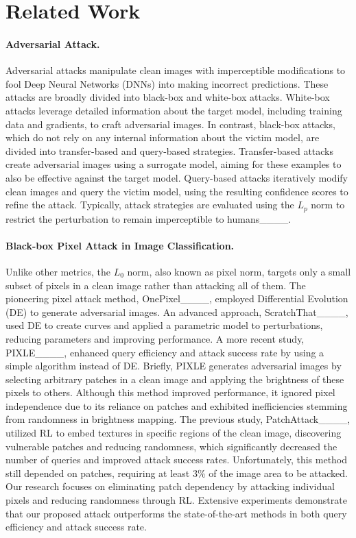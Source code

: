 \section{Related Work}
\paragraph{Adversarial Attack.}
Adversarial attacks manipulate clean images with imperceptible modifications to fool Deep Neural Networks (DNNs) into making incorrect predictions. These attacks are broadly divided into black-box and white-box attacks. White-box attacks leverage detailed information about the target model, including training data and gradients, to craft adversarial images. In contrast, black-box attacks, which do not rely on any internal information about the victim model, are divided into transfer-based and query-based strategies. Transfer-based attacks create adversarial images using a surrogate model, aiming for these examples to also be effective against the target model. Query-based attacks iteratively modify clean images and query the victim model, using the resulting confidence scores to refine the attack. Typically, attack strategies are evaluated using the $L_p$ norm to restrict the perturbation to remain imperceptible to humans____.


\paragraph{Black-box Pixel Attack in Image Classification.}
Unlike other metrics, the $L_0$ norm, also known as pixel norm, targets only a small subset of pixels in a clean image rather than attacking all of them. The pioneering pixel attack method, OnePixel____, employed Differential Evolution (DE) to generate adversarial images. An advanced approach, ScratchThat____, used DE to create curves and applied a parametric model to perturbations, reducing parameters and improving performance. A more recent study, PIXLE____, enhanced query efficiency and attack success rate by using a simple algorithm instead of DE. Briefly, PIXLE generates adversarial images by selecting arbitrary patches in a clean image and applying the brightness of these pixels to others. Although this method improved performance, it ignored pixel independence due to its reliance on patches and exhibited inefficiencies stemming from randomness in brightness mapping. The previous study, PatchAttack____, utilized RL to embed textures in specific regions of the clean image, discovering vulnerable patches and reducing randomness, which significantly decreased the number of queries and improved attack success rates. Unfortunately, this method still depended on patches, requiring at least 3\% of the image area to be attacked. Our research focuses on eliminating patch dependency by attacking individual pixels and reducing randomness through RL. Extensive experiments demonstrate that our proposed attack outperforms the state-of-the-art methods in both query efficiency and attack success rate.

